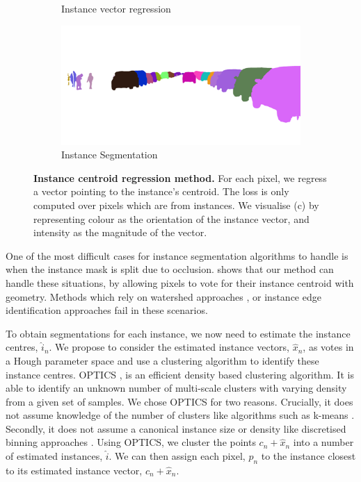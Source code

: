 \begin{figure}[t]
\begin{center}
\begin{subfigure}[t]{0.48\linewidth}
  \caption{Instance vector regression}
\end{subfigure}
\begin{subfigure}[t]{0.48\linewidth}
  \includegraphics[width=\linewidth]{example_instance/bielefeld_000000_001011_instance_segmentation.png}
  \caption{Instance Segmentation}
\end{subfigure}
\end{center}
   \caption[Instance centroid regression method.]{\textbf{Instance centroid regression method.} For each pixel, we regress a vector pointing to the instance's centroid. The loss is only computed over pixels which are from instances. We visualise (c) by representing colour as the orientation of the instance vector, and intensity as the magnitude of the vector.}
\label{fig:instance}
\end{figure}

One of the most difficult cases for instance segmentation algorithms to handle is when the instance mask is split due to occlusion.  shows that our method can handle these situations, by allowing pixels to vote for their instance centroid with geometry. Methods which rely on watershed approaches \citep{bai2016deep}, or instance edge identification approaches fail in these scenarios.

To obtain segmentations for each instance, we now need to estimate the instance centres, $\hat{i}_n$. We propose to consider the estimated instance vectors, $\hat{x}_n$, as votes in a Hough parameter space and use a clustering algorithm to identify these instance centres. OPTICS \citep{ankerst1999optics}, is an efficient density based clustering algorithm. It is able to identify an unknown number of multi-scale clusters with varying density from a given set of samples. We chose OPTICS for two reasons. Crucially, it does not assume knowledge of the number of clusters like algorithms such as k-means \citep{macqueen1967some}. Secondly, it does not assume a canonical instance size or density like discretised binning approaches \citep{comaniciu2002mean}. Using OPTICS, we cluster the points $c_n+\hat{x}_n$ into a number of estimated instances, $\hat{i}$. We can then assign each pixel, $p_n$ to the instance closest to its estimated instance vector, $c_n+\hat{x}_n$.

